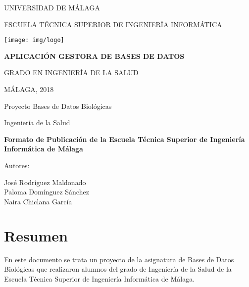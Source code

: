 \documentclass[12pt,a4paper]{article}
\begin{document}

\begin{center}
UNIVERSIDAD DE MÁLAGA

\vspace{1em}

ESCUELA TÉCNICA SUPERIOR DE INGENIERÍA INFORMÁTICA

\texttt{[image: img/logo]}

\vspace{3em}

\textbf{APLICACIÓN GESTORA DE BASES DE DATOS}


\vspace{7em}

GRADO EN INGENIERÍA DE LA SALUD

\vspace{1em}

MÁLAGA, 2018

\newpage

\vspace{15em}

Proyecto Bases de Datos Biológicas

Ingeniería de la Salud

\vspace{3em}

\textbf{Formato de Publicación de la Escuela Técnica Superior de Ingeniería Informática de Málaga}

\vspace{3em}

Autores:\\

\vspace{1em}

José Rodríguez Maldonado\\

Paloma Domínguez Sánchez\\

Naira Chiclana García  


\end{center}
\newpage
\section*{Resumen}


En este documento se trata un proyecto de la asignatura de Bases de Datos Biológicas que realizaron alumnos del grado de Ingeniería de la Salud de la Escuela Técnica Superior de Ingeniería Informática de Málaga.\\
\end{document}
